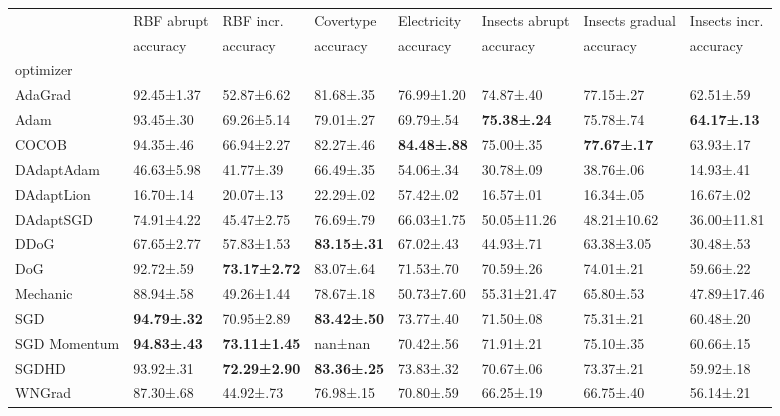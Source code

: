 \begin{tabular}{llllllll}
\toprule
 & RBF abrupt & RBF incr. & Covertype & Electricity & Insects abrupt & Insects gradual & Insects incr. \\
 & accuracy & accuracy & accuracy & accuracy & accuracy & accuracy & accuracy \\
optimizer &  &  &  &  &  &  &  \\
\midrule
AdaGrad & 92.45±1.37 & 52.87±6.62 & 81.68±.35 & 76.99±1.20 & 74.87±.40 & 77.15±.27 & 62.51±.59 \\
Adam & 93.45±.30 & 69.26±5.14 & 79.01±.27 & 69.79±.54 & \bfseries 75.38±.24 & 75.78±.74 & \bfseries 64.17±.13 \\
COCOB & 94.35±.46 & 66.94±2.27 & 82.27±.46 & \bfseries 84.48±.88 & 75.00±.35 & \bfseries 77.67±.17 & 63.93±.17 \\
DAdaptAdam & 46.63±5.98 & 41.77±.39 & 66.49±.35 & 54.06±.34 & 30.78±.09 & 38.76±.06 & 14.93±.41 \\
DAdaptLion & 16.70±.14 & 20.07±.13 & 22.29±.02 & 57.42±.02 & 16.57±.01 & 16.34±.05 & 16.67±.02 \\
DAdaptSGD & 74.91±4.22 & 45.47±2.75 & 76.69±.79 & 66.03±1.75 & 50.05±11.26 & 48.21±10.62 & 36.00±11.81 \\
DDoG & 67.65±2.77 & 57.83±1.53 & \bfseries 83.15±.31 & 67.02±.43 & 44.93±.71 & 63.38±3.05 & 30.48±.53 \\
DoG & 92.72±.59 & \bfseries 73.17±2.72 & 83.07±.64 & 71.53±.70 & 70.59±.26 & 74.01±.21 & 59.66±.22 \\
Mechanic & 88.94±.58 & 49.26±1.44 & 78.67±.18 & 50.73±7.60 & 55.31±21.47 & 65.80±.53 & 47.89±17.46 \\
SGD & \bfseries 94.79±.32 & 70.95±2.89 & \bfseries 83.42±.50 & 73.77±.40 & 71.50±.08 & 75.31±.21 & 60.48±.20 \\
SGD Momentum & \bfseries 94.83±.43 & \bfseries 73.11±1.45 & nan±nan & 70.42±.56 & 71.91±.21 & 75.10±.35 & 60.66±.15 \\
SGDHD & 93.92±.31 & \bfseries 72.29±2.90 & \bfseries 83.36±.25 & 73.83±.32 & 70.67±.06 & 73.37±.21 & 59.92±.18 \\
WNGrad & 87.30±.68 & 44.92±.73 & 76.98±.15 & 70.80±.59 & 66.25±.19 & 66.75±.40 & 56.14±.21 \\
\bottomrule
\end{tabular}
